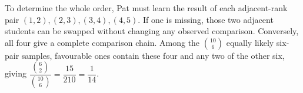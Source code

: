 To determine the whole order, Pat must learn the result of each adjacent-rank pair $(1,2),(2,3),(3,4),(4,5)$. If one is missing, those two adjacent students can be swapped without changing any observed comparison. Conversely, all four give a complete comparison chain. Among the $\binom{10}{6}$ equally likely six-pair samples, favourable ones contain these four and any two of the other six, giving $\dfrac{\binom62}{\binom{10}{6}}=\dfrac{15}{210}=\boxed{\dfrac{1}{14}}$.
